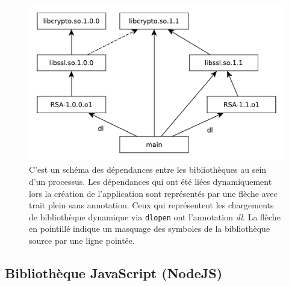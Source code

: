 \begin{center}
\begin{figure}[ht]
\includegraphics{figures/libssl_masking.pdf}

\caption{C'est un schéma des dépendances entre les bibliothèques au sein d'un
  processus.  Les dépendances qui ont été liées dynamiquement lors la création
  de l'application sont représentés par une flèche avec trait plein sans
  annotation. Ceux qui représentent les chargements de bibliothèque dynamique via
  \texttt{dlopen} ont l'annotation \textit{dl}. La flèche en pointillé indique
  un masquage des symboles de la bibliothèque source par une ligne pointée.}

\label{fig:scm_masq_schema}
\end{figure}
\end{center}










\subsection{Bibliothèque JavaScript (NodeJS)}

